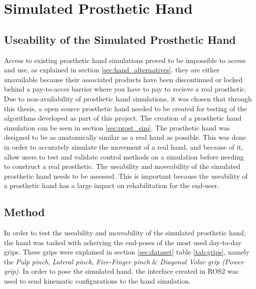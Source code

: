 \documentclass[../main.tex]{subfiles}
\begin{document}



\newpage
\section{Simulated Prosthetic Hand}

\subsection{Useability of the Simulated Prosthetic Hand}

Access to existing prosthetic hand simulations proved to be impossible to access and use, as explained in section \ref{sec:hand_alternatives}. they are either unavailable because their associated products have been discontinued or locked behind a pay-to-acces barrier where you have to pay to recieve a real prosthetic.
Due to non-availability of prosthetic hand simulations, it was chosen that through this thesis, a open source prosthetic hand needed to be created for testing of the algorithms developed as part of this project.
The creation of a prosthetic hand simulation can be seen in section \ref{sec:prost_sim}.
The prosthetic hand was designed to be as anatomically similar as a real hand as possible.
This was done in order to accurately simulate the movement of a real hand, and because of it, allow users to test and validate control methods on a simulation before needing to construct a real prosthetic.
The useability and moveability of the simulated prosthetic hand needs to be assessed.
This is important because the useability of a prosthetic hand has a large impact on rehabilitation for the end-user.

\subsection{Method}
In order to test the useability and moveability of the simulated prosthetic hand, the hand was tasked with acheiving the end-poses of the most used day-to-day grips.
These grips were explained in section \ref{sec:dataset} table \ref{tab:grips}, namely the \textit{Pulp pinch}, \textit{Lateral pinch}, \textit{Five-Finger pinch} \& \textit{Diagonal Volar grip (Power grip)}.
In order to pose the simulated hand, the interface created in ROS2 was used to send kinematic configurations to the hand simulation.
\end{document}
